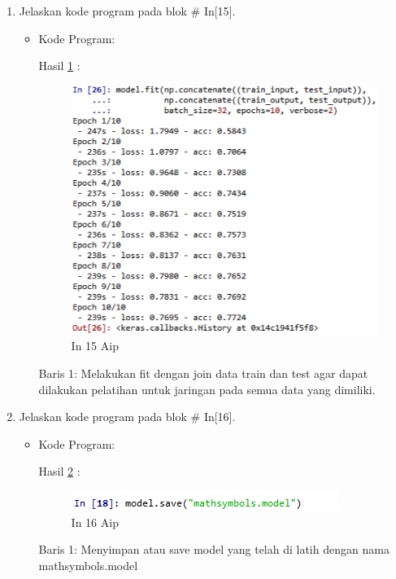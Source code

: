 \begin{enumerate}
\item Jelaskan kode program pada blok \# In[15].
\begin{itemize}
\item Kode Program:

\par Hasil \ref{in15aip} :
\begin{figure}[!hbtp]
\centering
\includegraphics[scale=0.7]{figures/AIP/prak15.PNG}
\caption{In 15 Aip}
\label{in15aip}
\end{figure}
\par Baris 1: Melakukan fit dengan join data train dan test agar dapat dilakukan pelatihan untuk jaringan pada semua data yang dimiliki.
\end{itemize}
\par

\item Jelaskan kode program pada blok \# In[16].
\begin{itemize}
\item Kode Program:

\par Hasil \ref{in16aip} :
\begin{figure}[!hbtp]
\centering
\includegraphics[scale=0.7]{figures/AIP/prak16.PNG}
\caption{In 16 Aip}
\label{in16aip}
\end{figure}
\par Baris 1: Menyimpan atau save model yang telah di latih dengan nama mathsymbols.model 
\end{itemize}
\par


\end{enumerate}

